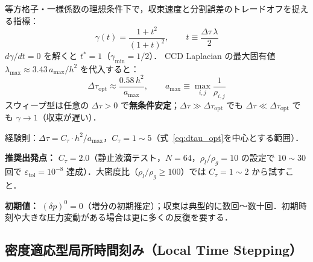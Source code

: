 \begin{tcolorbox}[resultbox, title={最適仮想時間刻み $\Delta\tau$ の理論（詳細：付録 §\ref{sec:dtau_derive}）}]
\label{result:dtau_opt}
等方格子・一様係数の理想条件下で，収束速度と分割誤差のトレードオフを捉える指標：
\[
  \gamma(t) = \frac{1 + t^2}{(1+t)^2},
  \qquad t \equiv \frac{\Delta\tau\,\lambda}{2}
\]
$d\gamma/dt = 0$ を解くと $t^* = 1$（$\gamma_{\min} = 1/2$）．
CCD Laplacian の最大固有値 $\lambda_{\max} \approx 3.43\,a_{\max}/h^2$ を代入すると：
\begin{equation}
  \Delta\tau_{\mathrm{opt}}
  \approx \frac{0.58\,h^2}{a_{\max}},
  \qquad
  a_{\max} \equiv \max_{i,j} \frac{1}{\rho_{i,j}}
  \label{eq:dtau_opt}
\end{equation}
スウィープ型は任意の $\Delta\tau > 0$ で\textbf{無条件安定}；$\Delta\tau \gg \Delta\tau_{\mathrm{opt}}$ でも $\Delta\tau \ll \Delta\tau_{\mathrm{opt}}$ でも $\gamma \to 1$（収束が遅い）．
\end{tcolorbox}

\label{box:dtau_impl}
経験則：$\Delta\tau = C_\tau \cdot h^2/a_{\max}$，$C_\tau = 1 \sim 5$（式~\eqref{eq:dtau_opt}を中心とする範囲）．

\textbf{推奨出発点：} $C_\tau = 2.0$（静止液滴テスト，$N=64$，$\rho_l/\rho_g=10$ の設定で $10\sim30$ 回で $\varepsilon_\text{tol}=10^{-8}$ 達成）．大密度比（$\rho_l/\rho_g \geq 100$）では $C_\tau=1\sim2$ から試すこと．

\textbf{初期値：} $(\delta p)^0 = 0$（増分の初期推定）；収束は典型的に数回〜数十回．初期時刻や大きな圧力変動がある場合は更に多くの反復を要する．

\subsection{密度適応型局所時間刻み（Local Time Stepping）}
\label{sec:lts_dtau}

